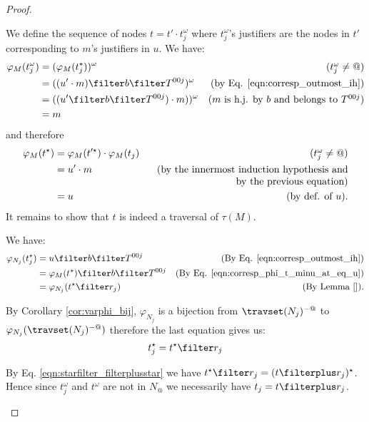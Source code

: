 \begin{proof}
\begin{enumerate}[$\bullet$]
\begin{enumerate}
\begin{enumerate}[-]
        We define the sequence of nodes $t = t'\cdot
        t_j^\omega$ where $t_j^\omega$'s justifiers are
        the nodes in $t'$ corresponding to $m$'s
        justifiers in $u$. We have:
        \begin{align*}
            \varphi_M (t_j^\omega) &= (\varphi_M (t_j^\star))^\omega & \mbox{($t_j^\omega \neq @$)}\\
                                   &= ((u' \cdot m) \filter b\filter T^{00j})^\omega & \mbox{(by Eq. \ref{eqn:corresp_outmost_ih})}\\
                                   &= ((u' \filter b\filter T^{00j}) \cdot m))^\omega & \mbox{($m$ is h.j. by $b$ and belongs to $T^{00j}$)}\\
                                   &= m
        \end{align*}
        and therefore
        \begin{align}
          \varphi_{M}(t^\star)  &=  \varphi_{M}(t'^\star)  \cdot \varphi_{M}(t_j) & \mbox{($t_j^\omega \neq @$)} \nonumber \\
                &=   u' \cdot m & \parbox[t]{7cm}{\raggedleft (by the innermost induction hypothesis and by the previous equation)} \nonumber \\
                &=   u & \mbox{(by def. of $u$).} \label{eqn:corresp_phi_t_minu_at_eq_u}
        \end{align}
        It remains to show that $t$ is indeed a traversal of $\tau(M)$.

        We have:
        \begin{align*}
        \varphi_{N_j}(t_j^\star) &= u \filter b \filter T^{00j}
            & \mbox{(By Eq. \ref{eqn:corresp_outmost_ih})} \\
         &= \varphi_{M}(t^\star) \filter b \filter T^{00j}
            & \mbox{(By Eq. \ref{eqn:corresp_phi_t_minu_at_eq_u})} \\
         &= \varphi_{N_j}(t^\star \filter r_j )
            & \mbox{(By Lemma \ref{}).}
        \end{align*}

        By Corollary \ref{cor:varphi_bij}, $\varphi_{N_j}$ is a bijection from $\travset(N_j)^{-@}$ to
        $\varphi_{N_j}( \travset(N_j)^{-@})$ therefore the last equation gives us:
         $$t_j^\star = t^\star \filter r_j $$

        By Eq. \ref{eqn:starfilter_filterplusstar} we
        have $t^\star \filter r_j = (t\filterplus
        r_j)^\star$. Hence since $t_j^\omega$ and
        $t^\omega$ are not in $N_@$ we necessarily have
        $t_j = t \filterplus r_j$.


\end{enumerate}
\end{enumerate}
\end{enumerate}
\end{proof}
